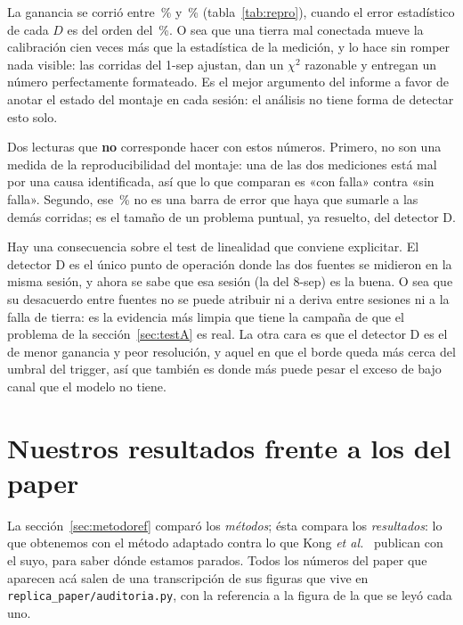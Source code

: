 \documentclass[11pt,a4paper]{article}
\begin{document}
La ganancia se corrió entre \RepMin\,\% y \RepMax\,\% (tabla~\ref{tab:repro}),
cuando el error estadístico de cada $D$ es del orden del \ErrRelMediano\,\%. O
sea que una tierra mal conectada mueve la calibración cien veces más que la
estadística de la medición, y lo hace sin romper nada visible: las corridas del
1-sep ajustan, dan un $\chi^2$ razonable y entregan un número perfectamente
formateado. Es el mejor argumento del informe a favor de anotar el estado del
montaje en cada sesión: el análisis no tiene forma de detectar esto solo.

\begin{aviso}
Dos lecturas que \textbf{no} corresponde hacer con estos números. Primero, no
son una medida de la reproducibilidad del montaje: una de las dos mediciones
está mal por una causa identificada, así que lo que comparan es «con falla»
contra «sin falla». Segundo, ese \RepMax\,\% no es una barra de error que haya
que sumarle a las demás corridas; es el tamaño de un problema puntual, ya
resuelto, del detector D.
\end{aviso}

Hay una consecuencia sobre el test de linealidad que conviene explicitar. El
detector D es el único punto de operación donde las dos fuentes se midieron en
la misma sesión, y ahora se sabe que esa sesión (la del 8-sep) es la buena. O
sea que su desacuerdo entre fuentes no se puede atribuir ni a deriva entre
sesiones ni a la falla de tierra: es la evidencia más limpia que tiene la
campaña de que el problema de la sección~\ref{sec:testA} es real. La otra cara
es que el detector D es el de menor ganancia y peor resolución, y aquel en que
el borde queda más cerca del umbral del trigger, así que también es donde más
puede pesar el exceso de bajo canal que el modelo no tiene.

\section{Nuestros resultados frente a los del paper}
\label{sec:paper}

La sección~\ref{sec:metodoref} comparó los \emph{métodos}; ésta compara los
\emph{resultados}: lo que obtenemos con el método adaptado contra lo que Kong
\emph{et al.}~\cite{kong2025} publican con el suyo, para saber dónde estamos
parados.
Todos los números del paper que aparecen acá salen de una transcripción de sus
figuras que vive en \texttt{replica\_paper/auditoria.py}, con la referencia a la
figura de la que se leyó cada uno.
\end{document}
